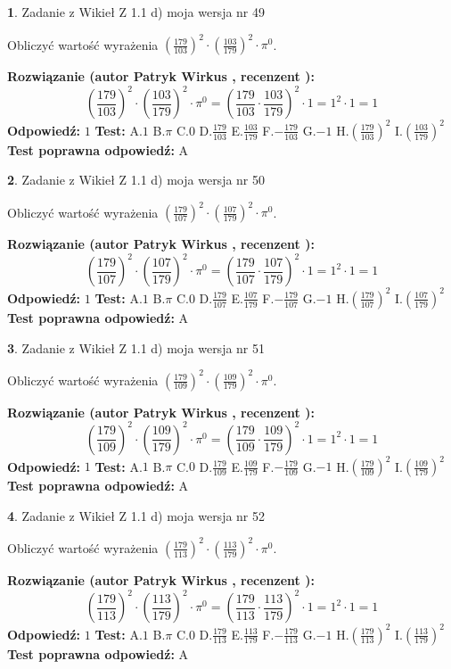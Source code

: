 \documentclass[12pt, a4paper]{article}
\theoremstyle{definition} %
\newtheorem{zad}{}
\newcommand{\zadStart}[1]{\begin{zad}#1\newline}
\newcommand{\zadStop}{\end{zad}}
\newcommand{\rozwStart}[2]{\noindent \textbf{Rozwiązanie (autor #1 , recenzent #2): }\newline}
\newcommand{\rozwStop}{\newline}
\newcommand{\odpStart}{\noindent \textbf{Odpowiedź:}\newline}
\newcommand{\odpStop}{\newline}
\newcommand{\testStart}{\noindent \textbf{Test:}\newline}
\newcommand{\testStop}{\newline}
\newcommand{\kluczStart}{\noindent \textbf{Test poprawna odpowiedź:}\newline}
\newcommand{\kluczStop}{\newline}
\begin{document}
\zadStart{Zadanie z Wikieł Z 1.1 d) moja wersja nr 49}

Obliczyć wartość wyrażenia $(\frac{179}{103})^{2} \cdot (\frac{103}{179})^{2} \cdot \pi^{0}$.
\zadStop
\rozwStart{Patryk Wirkus}{}
$$(\frac{179}{103})^{2} \cdot (\frac{103}{179})^{2} \cdot \pi^{0} = (\frac{179}{103} \cdot \frac{103}{179})^{2} \cdot 1 = 1^{2} \cdot 1 = 1$$
\rozwStop
\odpStart
$1$
\odpStop
\testStart
A.$1$ B.$\pi$ C.$0$ D.$\frac{179}{103}$ E.$\frac{103}{179}$
F.$-\frac{179}{103}$ G.$-1$
H.$(\frac{179}{103})^{2}$
I.$(\frac{103}{179})^{2}$
\testStop
\kluczStart
A
\kluczStop



\zadStart{Zadanie z Wikieł Z 1.1 d) moja wersja nr 50}

Obliczyć wartość wyrażenia $(\frac{179}{107})^{2} \cdot (\frac{107}{179})^{2} \cdot \pi^{0}$.
\zadStop
\rozwStart{Patryk Wirkus}{}
$$(\frac{179}{107})^{2} \cdot (\frac{107}{179})^{2} \cdot \pi^{0} = (\frac{179}{107} \cdot \frac{107}{179})^{2} \cdot 1 = 1^{2} \cdot 1 = 1$$
\rozwStop
\odpStart
$1$
\odpStop
\testStart
A.$1$ B.$\pi$ C.$0$ D.$\frac{179}{107}$ E.$\frac{107}{179}$
F.$-\frac{179}{107}$ G.$-1$
H.$(\frac{179}{107})^{2}$
I.$(\frac{107}{179})^{2}$
\testStop
\kluczStart
A
\kluczStop



\zadStart{Zadanie z Wikieł Z 1.1 d) moja wersja nr 51}

Obliczyć wartość wyrażenia $(\frac{179}{109})^{2} \cdot (\frac{109}{179})^{2} \cdot \pi^{0}$.
\zadStop
\rozwStart{Patryk Wirkus}{}
$$(\frac{179}{109})^{2} \cdot (\frac{109}{179})^{2} \cdot \pi^{0} = (\frac{179}{109} \cdot \frac{109}{179})^{2} \cdot 1 = 1^{2} \cdot 1 = 1$$
\rozwStop
\odpStart
$1$
\odpStop
\testStart
A.$1$ B.$\pi$ C.$0$ D.$\frac{179}{109}$ E.$\frac{109}{179}$
F.$-\frac{179}{109}$ G.$-1$
H.$(\frac{179}{109})^{2}$
I.$(\frac{109}{179})^{2}$
\testStop
\kluczStart
A
\kluczStop



\zadStart{Zadanie z Wikieł Z 1.1 d) moja wersja nr 52}

Obliczyć wartość wyrażenia $(\frac{179}{113})^{2} \cdot (\frac{113}{179})^{2} \cdot \pi^{0}$.
\zadStop
\rozwStart{Patryk Wirkus}{}
$$(\frac{179}{113})^{2} \cdot (\frac{113}{179})^{2} \cdot \pi^{0} = (\frac{179}{113} \cdot \frac{113}{179})^{2} \cdot 1 = 1^{2} \cdot 1 = 1$$
\rozwStop
\odpStart
$1$
\odpStop
\testStart
A.$1$ B.$\pi$ C.$0$ D.$\frac{179}{113}$ E.$\frac{113}{179}$
F.$-\frac{179}{113}$ G.$-1$
H.$(\frac{179}{113})^{2}$
I.$(\frac{113}{179})^{2}$
\testStop
\kluczStart
A
\kluczStop
\end{document}
